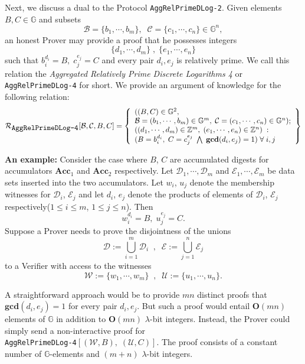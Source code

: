 \documentclass[11pt, lettersize, notitlepage, leqno, footskip=0.6cm]{article}
\newcommand{\bz}{\mathbb Z}
\newcommand{\Acc}{\mbf{Acc}}
\newcommand{\mc}{\mathcal}
\newcommand{\mb}{\mathbb}
\newcommand{\mbf}{\mathbf}
\newcommand{\lamb}{\lambda}
\newcommand{\vs}{\vspace{-0.15cm}}
\newcommand{\GCD}{\mbf{gcd}}
\numberwithin{equation}{section}
\begin{document}
Next, we discuss a dual to the Protocol \verb|AggRelPrimeDLog-2|. Given elements $B, C\in \mb{G}$ and subsets \vspace{-0.15cm}$$\mc{B} = \{b_1,\cdots, b_m\},\;\; \mc{C} = \{c_1,\cdots, c_n\}\in \mb{G}^n,$$ an honest Prover may provide a proof that he possesses integers \vs $$\{d_1,\cdots, d_m\}\;,\; \{e_1,\cdots, e_n\}$$ such that $b_i^{d_i} = B,\; c_j^{e_j} = C$ and every pair $d_i, e_j$ is relatively prime. We call this relation the \textit{Aggregated Relatively Prime Discrete Logarithms 4} or \verb|AggRelPrimeDLog-4| for short. We provide an argument of knowledge for the following relation:
\[
  \mc{R}_{{\protect\verb|AggRelPrimeDLog-4|}}[\mc{B}, \mc{C}, B, C] = \left\{\begin{array}{l}
    ((B,C)\in\mb{G}^2,\;\\
     \mc{B} = (b_1,\cdots,b_m)\in\mb{G}^m,\;\mc{C} = (c_1,\cdots, c_n)\in\mb{G}^n);\\
    ((d_1,\cdots,d_m)\in\bz^m,\; (e_1,\cdots,e_n)\in\bz^n)\;: \\
    (B = b_i^{d_i},\; C = c_j^{e_j}\;\bigwedge \; \GCD(d_i, e_j) = 1)\;\forall \;i,j
  \end{array}\right\}
\] 

\noindent \textbf{An example:} Consider the case where $B$, $C$ are accumulated digests for accumulators $\Acc_1$ and $\Acc_2$ respectively. Let $\mc{D}_1,\cdots,\mc{D}_m$ and $\mc{E}_1,\cdots,\mc{E}_m$ be data sets inserted into the two accumulators. Let $w_i$, $u_j$ denote the membership witnesses for $\mc{D}_i$, $\mc{E}_j$ and let $d_i$, $e_j$ denote the products of elements of $\mc{D}_i$, $\mc{E}_j$ respectively($1\leq i\leq m$, $1\leq j\leq n$). Then $$w_i^{d_i} = B,\; u_j^{e_j} = C.$$ Suppose a Prover needs to prove the disjointness of the unions $$\mc{D} := \bigcup\limits_{i=1}^m \mc{D}_i\;\;,\;\;\mc{E} := \bigcup\limits_{j=1}^n \mc{E}_j$$ to a Verifier with access to the witnesses \vspace{-0.15cm}$$\mc{W}:= \{w_1,\cdots,w_m \}\;\;,\;\;\mc{U}:= \{u_1,\cdots,u_n \}.$$

A straightforward approach would be to provide $mn$ distinct proofs that $\GCD(d_i, e_j) = 1$ for every pair $d_i,e_j$. But such a proof would entail $\mbf{O}(mn)$ elements of $\mb{G}$ in addition to $\mbf{O}(mn)$ $\lamb$-bit integers. Instead, the Prover could simply send a non-interactive proof for\\ \verb|AggRelPrimeDLog-4|$[(\mc{W}, B),\;(\mc{U}, C)]$. The proof consists of a constant number of $\mb{G}$-elements and $(m+n)$ $\lamb$-bit integers.\vspace{0.1cm} 
\end{document}

